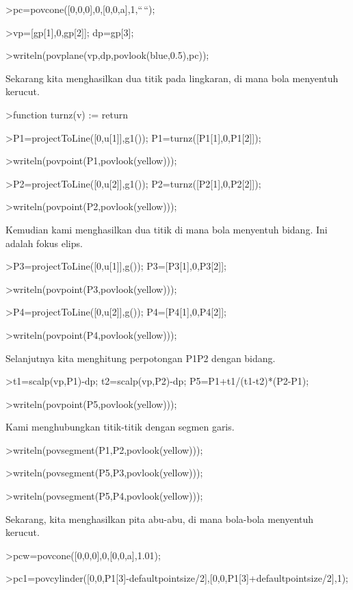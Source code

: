 \documentclass[
]{book}
\begin{document}
\textgreater pc=povcone({[}0,0,0{]},0,{[}0,0,a{]},1,``\,``);

\textgreater vp={[}gp{[}1{]},0,gp{[}2{]}{]}; dp=gp{[}3{]};

\textgreater writeln(povplane(vp,dp,povlook(blue,0.5),pc));

Sekarang kita menghasilkan dua titik pada lingkaran, di mana bola menyentuh kerucut.

\textgreater function turnz(v) := return

\textgreater P1=projectToLine({[}0,u{[}1{]}{]},g1()); P1=turnz({[}P1{[}1{]},0,P1{[}2{]}{]});

\textgreater writeln(povpoint(P1,povlook(yellow)));

\textgreater P2=projectToLine({[}0,u{[}2{]}{]},g1()); P2=turnz({[}P2{[}1{]},0,P2{[}2{]}{]});

\textgreater writeln(povpoint(P2,povlook(yellow)));

Kemudian kami menghasilkan dua titik di mana bola menyentuh bidang. Ini adalah fokus elips.

\textgreater P3=projectToLine({[}0,u{[}1{]}{]},g()); P3={[}P3{[}1{]},0,P3{[}2{]}{]};

\textgreater writeln(povpoint(P3,povlook(yellow)));

\textgreater P4=projectToLine({[}0,u{[}2{]}{]},g()); P4={[}P4{[}1{]},0,P4{[}2{]}{]};

\textgreater writeln(povpoint(P4,povlook(yellow)));

Selanjutnya kita menghitung perpotongan P1P2 dengan bidang.

\textgreater t1=scalp(vp,P1)-dp; t2=scalp(vp,P2)-dp; P5=P1+t1/(t1-t2)*(P2-P1);

\textgreater writeln(povpoint(P5,povlook(yellow)));

Kami menghubungkan titik-titik dengan segmen garis.

\textgreater writeln(povsegment(P1,P2,povlook(yellow)));

\textgreater writeln(povsegment(P5,P3,povlook(yellow)));

\textgreater writeln(povsegment(P5,P4,povlook(yellow)));

Sekarang, kita menghasilkan pita abu-abu, di mana bola-bola menyentuh kerucut.

\textgreater pcw=povcone({[}0,0,0{]},0,{[}0,0,a{]},1.01);

\textgreater pc1=povcylinder({[}0,0,P1{[}3{]}-defaultpointsize/2{]},{[}0,0,P1{[}3{]}+defaultpointsize/2{]},1);
\end{document}

